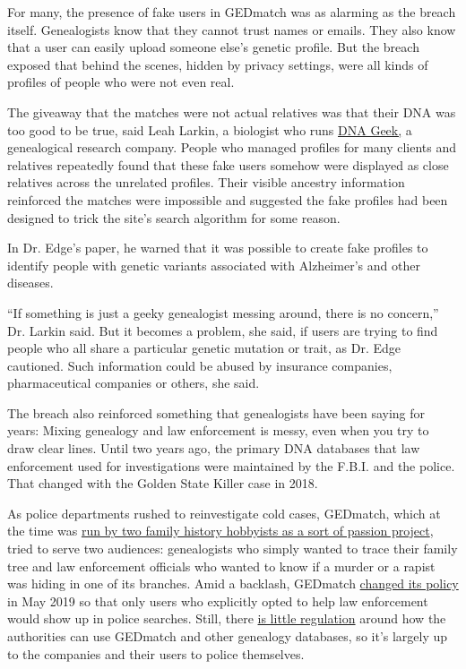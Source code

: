 For many, the presence of fake users in GEDmatch was as alarming as the
breach itself. Genealogists know that they cannot trust names or emails.
They also know that a user can easily upload someone else's genetic
profile. But the breach exposed that behind the scenes, hidden by
privacy settings, were all kinds of profiles of people who were not even
real.

The giveaway that the matches were not actual relatives was that their
DNA was too good to be true, said Leah Larkin, a biologist who runs
\href{https://thednageek.com/about/}{DNA Geek,} a genealogical research
company. People who managed profiles for many clients and relatives
repeatedly found that these fake users somehow were displayed as close
relatives across the unrelated profiles. Their visible ancestry
information reinforced the matches were impossible and suggested the
fake profiles had been designed to trick the site's search algorithm for
some reason.

In Dr. Edge's paper, he warned that it was possible to create fake
profiles to identify people with genetic variants associated with
Alzheimer's and other diseases.

``If something is just a geeky genealogist messing around, there is no
concern,'' Dr. Larkin said. But it becomes a problem, she said, if users
are trying to find people who all share a particular genetic mutation or
trait, as Dr. Edge cautioned. Such information could be abused by
insurance companies, pharmaceutical companies or others, she said.

The breach also reinforced something that genealogists have been saying
for years: Mixing genealogy and law enforcement is messy, even when you
try to draw clear lines. Until two years ago, the primary DNA databases
that law enforcement used for investigations were maintained by the
F.B.I. and the police. That changed with the Golden State Killer case in
2018.

As police departments rushed to reinvestigate cold cases, GEDmatch,
which at the time was
\href{https://www.nytimes.com/2018/10/15/science/gedmatch-genealogy-cold-cases.html}{run
by two family history hobbyists as a sort of passion project}, tried to
serve two audiences: genealogists who simply wanted to trace their
family tree and law enforcement officials who wanted to know if a murder
or a rapist was hiding in one of its branches. Amid a backlash, GEDmatch
\href{https://www.legalgenealogist.com/2019/05/19/gedmatch-reverses-course/}{changed
its policy} in May 2019 so that only users who explicitly opted to help
law enforcement would show up in police searches. Still, there
\href{https://www.nytimes.com/2019/10/05/us/genetic-genealogy-guidelines-privacy.html}{is
little regulation} around how the authorities can use GEDmatch and other
genealogy databases, so it's largely up to the companies and their users
to police themselves.

